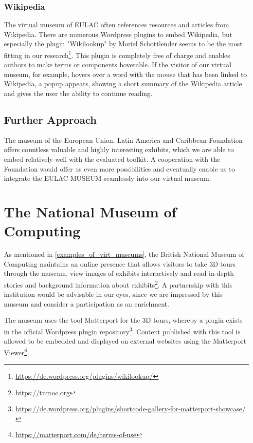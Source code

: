 \subsubsection{Wikipedia}

The virtual museum of EULAC often references resources and articles from Wikipedia. There are numerous Wordpress plugins to embed Wikipedia, but especially the plugin "Wikilookup" by Moriel Schottlender seems to be the most fitting in our research\footnote{\url{https://de.wordpress.org/plugins/wikilookup/}}. This plugin is completely free of charge and enables authors to make terms or components hoverable. If the visitor of our virtual museum, for example, hovers over a word with the mouse that has been linked to Wikipedia, a popup appears, showing a short summary of the Wikipedia article and gives the user the ability to continue reading. 


\subsection{Further Approach}

The museum of the European Union, Latin America and Caribbean Foundation offers countless valuable and highly interesting exhibits, which we are able to embed relatively well with the evaluated toolkit. A cooperation with the Foundation would offer us even more possibilities and eventually enable us to integrate the EULAC MUSEUM seamlessly into our virtual museum. 

\section{The National Museum of Computing}

As mentioned in \ref{examples_of_virt_museums}, the British National Museum of Computing maintains an online presence that allows visitors to take 3D tours through the museum, view images of exhibits interactively and read in-depth stories and background information about exhibits\footnote{\url{https://tnmoc.org}}. A partnership with this institution would be advisable in our eyes, since we are impressed by this museum and consider a participation as an enrichment.

The museum uses the tool Matterport for the 3D tours, whereby a plugin exists in the official Wordpress plugin repository\footnote{\url{https://de.wordpress.org/plugins/shortcode-gallery-for-matterport-showcase/}}. Content published with this tool is allowed to be embedded and displayed on external websites using the Matterport Viewer\footnote{\url{https://matterport.com/de/terms-of-use}}.